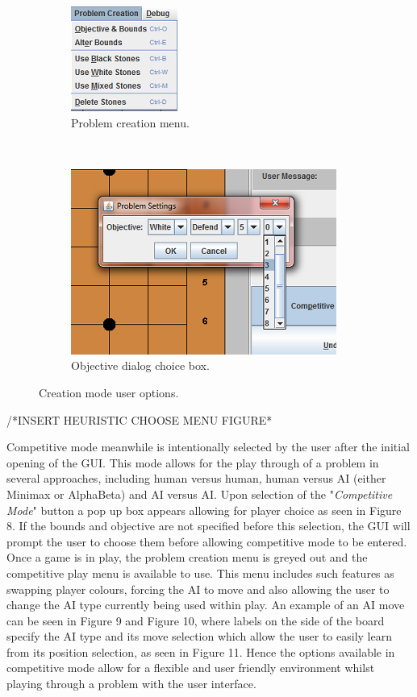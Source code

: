 \documentclass{l3proj}
\begin{document}
\begin{figure}[H]
\begin{subfigure}[H]{0.2\textwidth}
\includegraphics[scale=1]{Images/GUI-6-PCMenu.png}
\caption{Problem creation menu.}
\end{subfigure}
~~~~~~~~~~~~~~~~~~~~~~~~~~~
\begin{subfigure}[H]{0.3\textwidth}
\includegraphics[scale=1]{Images/GUI-7-Objective.png}
\caption{Objective dialog choice box.}
\end{subfigure}
\caption{Creation mode user options.}
\end{figure}

/*INSERT HEURISTIC CHOOSE MENU FIGURE*

Competitive mode meanwhile is intentionally selected by the user after the initial opening of the GUI. This mode allows for the play through of a problem in several approaches, including human versus human, human versus AI (either Minimax or AlphaBeta) and AI versus AI. Upon selection of the "\textit{Competitive Mode}" button a pop up box appears allowing for player choice as seen in Figure 8. If the bounds and objective are not specified before this selection, the GUI will prompt the user to choose them before allowing competitive mode to be entered. Once a game is in play, the problem creation menu is greyed out and the competitive play menu is available to use. This menu includes such features as swapping player colours, forcing the AI to move and also allowing the user to change the AI type currently being used within play. An example of an AI move can be seen in Figure 9 and Figure 10, where labels on the side of the board specify the AI type and its move selection which allow the user to easily learn from its position selection, as seen in Figure 11. Hence the options available in competitive mode allow for a flexible and user friendly environment whilst playing through a problem with the user interface.
\end{document}
